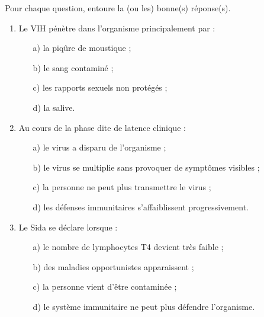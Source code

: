 \documentclass[11pt]{article}
\begin{document}
\begin{exercice}[QCM]
Pour chaque question, entoure la (ou les) bonne(s) réponse(s).
\begin{enumerate}
  \item Le VIH pénètre dans l'organisme principalement par :
  \begin{enumerate}
    \item[a)] la piqûre de moustique ;
    \item[b)] le sang contaminé ;
    \item[c)] les rapports sexuels non protégés ;
    \item[d)] la salive.
  \end{enumerate}
  \item Au cours de la phase dite de \og latence clinique \fg{} :
  \begin{enumerate}
    \item[a)] le virus a disparu de l'organisme ;
    \item[b)] le virus se multiplie sans provoquer de symptômes visibles ;
    \item[c)] la personne ne peut plus transmettre le virus ;
    \item[d)] les défenses immunitaires s'affaiblissent progressivement.
  \end{enumerate}
  \item Le Sida se déclare lorsque :
  \begin{enumerate}
    \item[a)] le nombre de lymphocytes T4 devient très faible ;
    \item[b)] des maladies opportunistes apparaissent ;
    \item[c)] la personne vient d'être contaminée ;
    \item[d)] le système immunitaire ne peut plus défendre l'organisme.
  \end{enumerate}
\end{enumerate}
\end{exercice}
\end{document}
